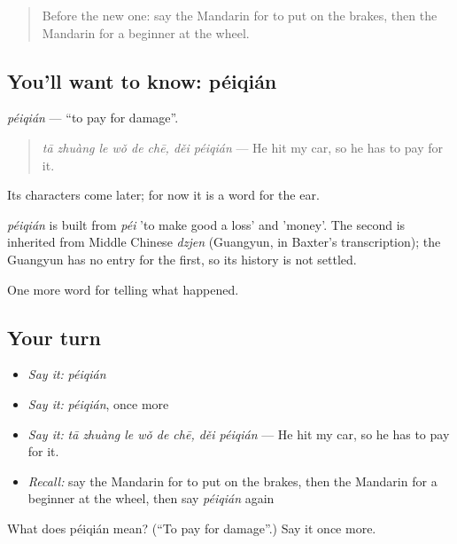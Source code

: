 \label{lesson:ZH-C296-peiqian}



\begin{quote}
Before the new one: say the Mandarin for to put on the brakes, then the Mandarin for a beginner at the wheel.
\end{quote}

\subsection*{You'll want to know: péiqián}
\emph{péiqián} — \textquotedblleft{}to pay for damage\textquotedblright{}.

\begin{quote}
\emph{tā zhuàng le wǒ de chē, děi péiqián} — He hit my car, so he has to pay for it.
\end{quote}

Its characters come later; for now it is a word for the ear.

\begin{cousinweb}
\emph{péiqián} is built from \emph{péi} 'to make good a loss' and  'money'. The second is inherited from Middle Chinese \emph{dzjen} (Guangyun, in Baxter's transcription); the Guangyun has no entry for the first, so its history is not settled.
\end{cousinweb}

\begin{grammarlens}[title={What you've built}]
One more word for telling what happened.
\end{grammarlens}

\subsection*{Your turn}
\begin{itemize}
\raggedright
  \item \emph{Say it:} \emph{péiqián}
  \item \emph{Say it:} \emph{péiqián}, once more
  \item \emph{Say it:} \emph{tā zhuàng le wǒ de chē, děi péiqián} — He hit my car, so he has to pay for it.
  \item \emph{Recall:} say the Mandarin for to put on the brakes, then the Mandarin for a beginner at the wheel, then say \emph{péiqián} again
\end{itemize}

\begin{tcolorbox}[breakable,colback=teal!4,colframe=teal!35!black,title={Before you move on}]
What does péiqián mean? (\textquotedblleft{}To pay for damage\textquotedblright{}.) Say it once more.
\end{tcolorbox}
